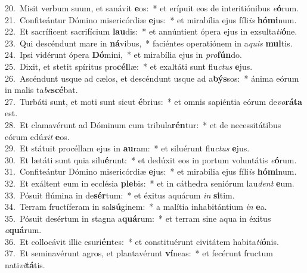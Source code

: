 {20.~}Misit verbum suum, et sanávit \textbf{e}os:~* et erípuit eos de interitiónibus \textit{e}\textbf{ó}rum.\\
{21.~}Confiteántur Dómino misericórdiæ \textbf{e}jus:~* et mirabília ejus fíli\textit{is} \textbf{hó}\textbf{mi}num.\\
{22.~}Et sacríficent sacrifícium \textbf{lau}dis:~* et annúntient ópera ejus in exsulta\textit{ti}\textbf{ó}ne.\\
{23.~}Qui descéndunt mare in \textbf{ná}vibus,~* faciéntes operatiónem in a\textit{quis} \textbf{mul}tis.\\
{24.~}Ipsi vidérunt ópera \textbf{Dó}mini,~* et mirabília ejus in \textit{pro}\textbf{fún}do.\\
{25.~}Dixit, et stetit spíritus pro\textbf{cél}læ:~* et exaltáti sunt flu\textit{ctus} \textbf{e}jus.\\
{26.~}Ascéndunt usque ad cælos, et descéndunt usque ad a\textbf{býs}sos:~* ánima eórum in malis ta\textit{be}\textbf{scé}bat.\\
{27.~}Turbáti sunt, et moti sunt sicut \textbf{é}brius:~* et omnis sapiéntia eórum de\textit{vo}\textbf{rá}\textbf{ta} est.\\
{28.~}Et clamavérunt ad Dóminum cum tribula\textbf{rén}tur:~* et de necessitátibus eórum edú\textit{xit} \textbf{e}os.\\
{29.~}Et státuit procéllam ejus in \textbf{au}ram:~* et siluérunt flu\textit{ctus} \textbf{e}jus.\\
{30.~}Et lætáti sunt quia silu\textbf{é}runt:~* et dedúxit eos in portum voluntátis \textit{e}\textbf{ó}rum.\\
{31.~}Confiteántur Dómino misericórdiæ \textbf{e}jus:~* et mirabília ejus fíli\textit{is} \textbf{hó}\textbf{mi}num.\\
{32.~}Et exáltent eum in ecclésia \textbf{ple}bis:~* et in cáthedra seniórum lau\textit{dent} \textbf{e}um.\\
{33.~}Pósuit flúmina in de\textbf{sér}tum:~* et éxitus aquárum \textit{in} \textbf{si}tim.\\
{34.~}Terram fructíferam in sal\textbf{sú}ginem:~* a malítia inhabitántium \textit{in} \textbf{e}a.\\
{35.~}Pósuit desértum in stagna a\textbf{quá}rum:~* et terram sine aqua in éxitus \textit{a}\textbf{quá}rum.\\
{36.~}Et collocávit illic esuri\textbf{én}tes:~* et constituérunt civitátem habita\textit{ti}\textbf{ó}nis.\\
{37.~}Et seminavérunt agros, et plantavérunt \textbf{ví}neas:~* et fecérunt fructum nati\textit{vi}\textbf{tá}tis.\\
